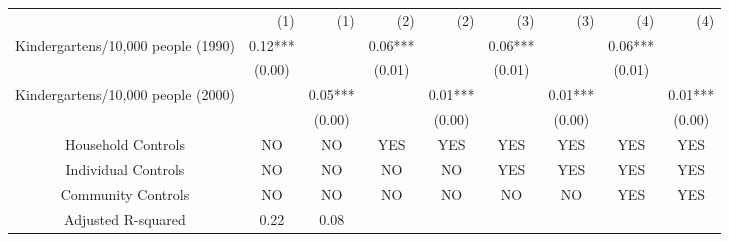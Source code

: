\begin{tabular}{lllllllll}
\cline{1-9}
\multicolumn{1}{c}{} &
  \multicolumn{1}{r}{(1)} &
  \multicolumn{1}{r}{(1)} &
  \multicolumn{1}{r}{(2)} &
  \multicolumn{1}{r}{(2)} &
  \multicolumn{1}{r}{(3)} &
  \multicolumn{1}{r}{(3)} &
  \multicolumn{1}{r}{(4)} &
  \multicolumn{1}{r}{(4)} \\
\cline{1-9}
\multicolumn{1}{l}{Kindergartens/10,000 people (1990)} &
  \multicolumn{1}{c}{0.12***} &
  \multicolumn{1}{c}{} &
  \multicolumn{1}{c}{0.06***} &
  \multicolumn{1}{c}{} &
  \multicolumn{1}{c}{0.06***} &
  \multicolumn{1}{c}{} &
  \multicolumn{1}{c}{0.06***} &
  \multicolumn{1}{c}{} \\
\multicolumn{1}{l}{} &
  \multicolumn{1}{c}{(0.00)} &
  \multicolumn{1}{c}{} &
  \multicolumn{1}{c}{(0.01)} &
  \multicolumn{1}{c}{} &
  \multicolumn{1}{c}{(0.01)} &
  \multicolumn{1}{c}{} &
  \multicolumn{1}{c}{(0.01)} &
  \multicolumn{1}{c}{} \\
\multicolumn{1}{l}{Kindergartens/10,000 people (2000)} &
  \multicolumn{1}{c}{} &
  \multicolumn{1}{c}{0.05***} &
  \multicolumn{1}{c}{} &
  \multicolumn{1}{c}{0.01***} &
  \multicolumn{1}{c}{} &
  \multicolumn{1}{c}{0.01***} &
  \multicolumn{1}{c}{} &
  \multicolumn{1}{c}{0.01***} \\
\multicolumn{1}{l}{} &
  \multicolumn{1}{c}{} &
  \multicolumn{1}{c}{(0.00)} &
  \multicolumn{1}{c}{} &
  \multicolumn{1}{c}{(0.00)} &
  \multicolumn{1}{c}{} &
  \multicolumn{1}{c}{(0.00)} &
  \multicolumn{1}{c}{} &
  \multicolumn{1}{c}{(0.00)} \\
\multicolumn{1}{c}{Household Controls} &
  \multicolumn{1}{c}{NO} &
  \multicolumn{1}{c}{NO} &
  \multicolumn{1}{c}{YES} &
  \multicolumn{1}{c}{YES} &
  \multicolumn{1}{c}{YES} &
  \multicolumn{1}{c}{YES} &
  \multicolumn{1}{c}{YES} &
  \multicolumn{1}{c}{YES} \\
\multicolumn{1}{c}{Individual Controls} &
  \multicolumn{1}{c}{NO} &
  \multicolumn{1}{c}{NO} &
  \multicolumn{1}{c}{NO} &
  \multicolumn{1}{c}{NO} &
  \multicolumn{1}{c}{YES} &
  \multicolumn{1}{c}{YES} &
  \multicolumn{1}{c}{YES} &
  \multicolumn{1}{c}{YES} \\
\multicolumn{1}{c}{Community Controls} &
  \multicolumn{1}{c}{NO} &
  \multicolumn{1}{c}{NO} &
  \multicolumn{1}{c}{NO} &
  \multicolumn{1}{c}{NO} &
  \multicolumn{1}{c}{NO} &
  \multicolumn{1}{c}{NO} &
  \multicolumn{1}{c}{YES} &
  \multicolumn{1}{c}{YES} \\
\multicolumn{1}{c}{Adjusted R-squared} &
  \multicolumn{1}{c}{0.22} &
  \multicolumn{1}{c}{0.08} &

\end{tabular}
